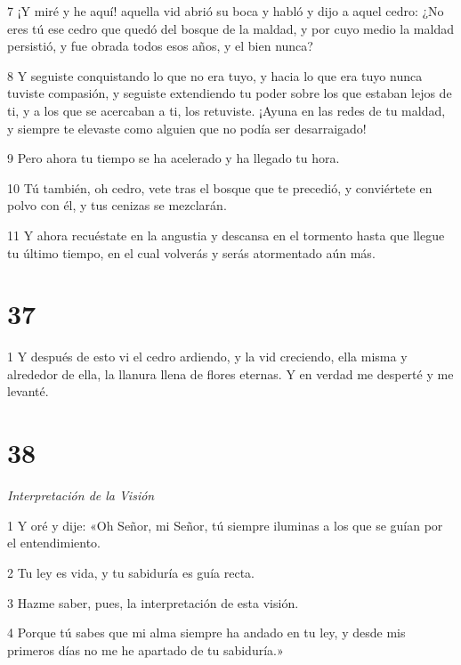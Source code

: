 \par 7 ¡Y miré y he aquí! aquella vid abrió su boca y habló y dijo a aquel cedro: ¿No eres tú ese cedro que quedó del bosque de la maldad, y por cuyo medio la maldad persistió, y fue obrada todos esos años, y el bien nunca?

\par 8 Y seguiste conquistando lo que no era tuyo, y hacia lo que era tuyo nunca tuviste compasión, y seguiste extendiendo tu poder sobre los que estaban lejos de ti, y a los que se acercaban a ti, los retuviste. ¡Ayuna en las redes de tu maldad, y siempre te elevaste como alguien que no podía ser desarraigado!

\par 9 Pero ahora tu tiempo se ha acelerado y ha llegado tu hora.

\par 10 Tú también, oh cedro, vete tras el bosque que te precedió, y conviértete en polvo con él, y tus cenizas se mezclarán.

\par 11 Y ahora recuéstate en la angustia y descansa en el tormento hasta que llegue tu último tiempo, en el cual volverás y serás atormentado aún más.

\chapter{37}

\par 1 Y después de esto vi el cedro ardiendo, y la vid creciendo, ella misma y alrededor de ella, la llanura llena de flores eternas. Y en verdad me desperté y me levanté.

\chapter{38}

\par \textit{Interpretación de la Visión}

\par 1 Y oré y dije: «Oh Señor, mi Señor, tú siempre iluminas a los que se guían por el entendimiento.

\par 2 Tu ley es vida, y tu sabiduría es guía recta.

\par 3 Hazme saber, pues, la interpretación de esta visión.

\par 4 Porque tú sabes que mi alma siempre ha andado en tu ley, y desde mis primeros días no me he apartado de tu sabiduría.»

